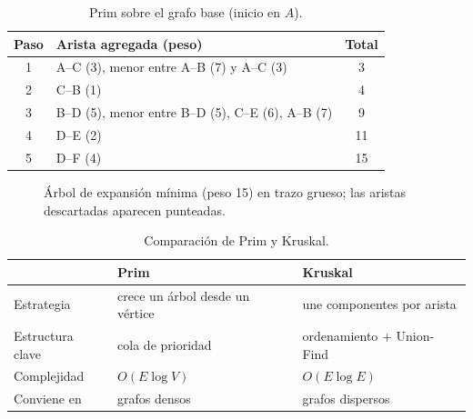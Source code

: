 \documentclass[conference]{IEEEtran}
\begin{document}
\begin{table}[h]
\caption{Prim sobre el grafo base (inicio en $A$).}
\label{tab:prim}
\centering
\small
\begin{tabular}{clc}
\toprule
\textbf{Paso} & \textbf{Arista agregada (peso)} & \textbf{Total} \\
\midrule
1 & A--C (3), menor entre A--B (7) y A--C (3) & 3 \\
2 & C--B (1) & 4 \\
3 & B--D (5), menor entre B--D (5), C--E (6), A--B (7) & 9 \\
4 & D--E (2) & 11 \\
5 & D--F (4) & 15 \\
\bottomrule
\end{tabular}
\end{table}

\begin{figure}[t]
\centering
{}
\caption{Árbol de expansión mínima (peso 15) en trazo grueso; las aristas descartadas aparecen punteadas.}
\label{fig:mst}
\end{figure}

\begin{table}[h]
\caption{Comparación de Prim y Kruskal.}
\label{tab:mst}
\centering
\small
\begin{tabular}{lp{2.7cm}p{2.7cm}}
\toprule
 & \textbf{Prim} & \textbf{Kruskal} \\
\midrule
Estrategia & crece un árbol desde un vértice & une componentes por arista \\
Estructura clave & cola de prioridad & ordenamiento + Union-Find \\
Complejidad & $O(E\log V)$ & $O(E\log E)$ \\
Conviene en & grafos densos & grafos dispersos \\
\bottomrule
\end{tabular}
\end{table}
\end{document}
